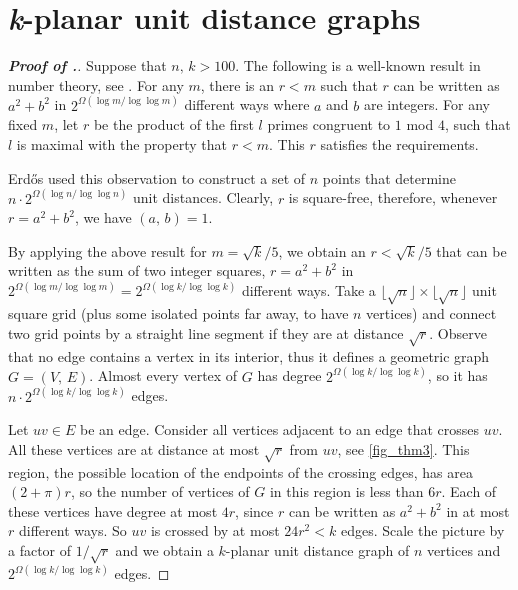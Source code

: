 \documentclass[a4paper,10pt]{article}
\begin{document}
\section{{\em k}-planar unit distance graphs} \label{sec3}

\begin{proof}[\bf Proof of .]
Suppose that $n, \, k >100$.  The following is a well-known result in number theory, see \cite{PA11, M13}. For any $m$, there is an $r<m$ such that $r$ can be written as $a^2+b^2$ in  $2^{\Omega(\log m/\log\log m)}$ different ways where $a$ and $b$ are integers. For any fixed $m$, let $r$ be the product of the first $l$ primes congruent to $1$ mod $4$, such that $l$ is maximal with the property that $r<m$. This $r$ satisfies the requirements. 

Erd\H os \cite{E46} used this observation  to construct a set of $n$ points that determine $n \cdot 2^{\Omega(\log n/\log\log n)}$ unit distances. Clearly, $r$ is square-free, therefore, whenever $r=a^2+b^2$, we have $(a, \, b)=1$. 


By applying the above result for $m=\sqrt{k}/5$, we obtain an $r<\sqrt{k}/5$ that can be written as the sum of two integer squares, $r=a^2+b^2$ in
$2^{\Omega(\log m/\log\log m)}= 2^{\Omega(\log k/\log\log k)}$ different ways. Take a 
$\lfloor\sqrt{n}\rfloor\times\lfloor\sqrt{n}\rfloor$ unit square grid (plus some isolated points far away, to have $n$ vertices) 
and connect two grid points by a straight line segment if they are at distance $\sqrt{r}$. Observe that no edge contains a vertex in its interior, thus it defines a geometric graph $G=(V, \, E)$. Almost every vertex of $G$ has degree $2^{\Omega(\log k/\log\log k)}$, so it has $n \cdot 2^{\Omega(\log k/\log\log k)}$ edges.

Let $uv \in E$ be an edge. Consider all vertices adjacent to an edge that crosses $uv$. All these vertices are at distance at most $\sqrt{r}$ from $uv$, see \cref{fig_thm3}. This region, the possible location of the endpoints of the crossing edges,  has area $(2+\pi)r$, so the number of vertices of $G$ in this region is less than $6r$. 
Each of these vertices have degree at most $4r$, 
since $r$ can be written as  $a^2+b^2$ in at most $r$ different ways.
So $uv$ is crossed by at most $24r^2<k$ edges. Scale the picture by a factor of $1/\sqrt{r}$ and we obtain a $k$-planar unit distance graph of $n$ vertices and $2^{\Omega(\log k/\log\log k)}$ edges.
\end{proof}
\end{document}
